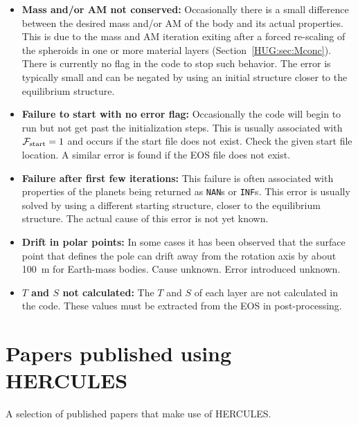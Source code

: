 \documentclass[11pt, oneside]{article}   	%
\begin{document}
\begin{itemize}
\item {\bf Mass and/or AM not conserved:} Occasionally there is a small difference between the desired mass and/or AM of the body and its actual properties. This is due to the mass and AM iteration exiting after a forced re-scaling of the spheroids in one or more material layers (Section~\ref{HUG:sec:Mconc}). There is currently no flag in the code to stop such behavior. The error is typically small and can be negated by using an initial structure closer to the equilibrium structure.
\item {\bf Failure to start with no error flag: } Occasionally the code will begin to run but not get past the initialization steps. This is usually associated with $\mathcal{F}_{\rm start}=1$ and occurs if the start file does not exist. Check the given start file location. A similar error is found if the EOS file does not exist.
\item {\bf Failure after first few iterations: } This failure is often associated with properties of the planets being returned as \texttt{NAN}s or \texttt{INF}s. This error is usually solved by using a different starting structure, closer to the equilibrium structure. The actual cause of this error is not yet known.
\item {\bf Drift in polar points:} In some cases it has been observed that the surface point that defines the pole can drift away from the rotation axis by about 100~m for Earth-mass bodies. Cause unknown. Error introduced unknown.
\item {\bf $T$ and $S$ not calculated:} The $T$ and $S$ of each layer are not calculated in the code. These values must be extracted from the EOS in post-processing.

\end{itemize}




\section{Papers published using HERCULES}
\label{HUG:sec:papers}

A selection of published papers that make use of HERCULES.\\

\noindent {} \\ \\
\noindent{}\\ \\
\noindent{}\\ \\
\noindent{}\\ \\
\noindent{}\\
\end{document}
